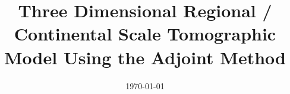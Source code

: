 \documentclass[a4paper, 11pt, oneside]{Thesis}  %
\begin{document}
\frontmatter	  %

\title  {Three Dimensional Regional / Continental Scale Tomographic Model Using the Adjoint Method} 
                        
\addresses  {\groupname\\\deptname\\\univname}  %
\date       {\today}
\subject    {}
\keywords   {}

\maketitle


\fancyhead{}  %
\rhead{\thepage}  %
\lhead{}  %

\pagestyle{fancy}  %




\pagestyle{fancy}  %




\mainmatter	  %
\pagestyle{fancy}  %

% 
\end{document}
